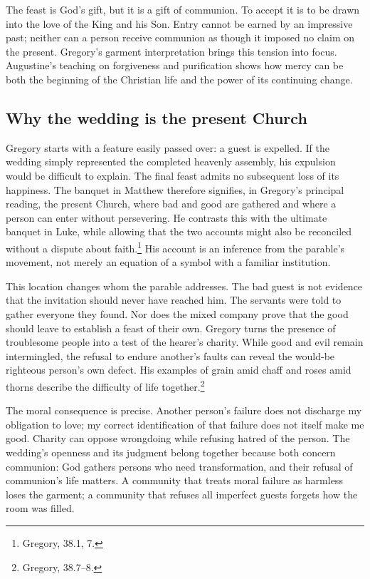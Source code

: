 \clearpage
{}
The feast is God's gift, but it is a gift of communion. To accept it is to be drawn into the love of the King and his Son. Entry cannot be earned by an impressive past; neither can a person receive communion as though it imposed no claim on the present. Gregory's garment interpretation brings this tension into focus. Augustine's teaching on forgiveness and purification shows how mercy can be both the beginning of the Christian life and the power of its continuing change.

\subsection{Why the wedding is the present Church}
Gregory starts with a feature easily passed over: a guest is expelled. If the wedding simply represented the completed heavenly assembly, his expulsion would be difficult to explain. The final feast admits no subsequent loss of its happiness. The banquet in Matthew therefore signifies, in Gregory's principal reading, the present Church, where bad and good are gathered and where a person can enter without persevering. He contrasts this with the ultimate banquet in Luke, while allowing that the two accounts might also be reconciled without a dispute about faith.\footnote{Gregory,  38.1, 7.} His account is an inference from the parable's movement, not merely an equation of a symbol with a familiar institution.

This location changes whom the parable addresses. The bad guest is not evidence that the invitation should never have reached him. The servants were told to gather everyone they found. Nor does the mixed company prove that the good should leave to establish a feast of their own. Gregory turns the presence of troublesome people into a test of the hearer's charity. While good and evil remain intermingled, the refusal to endure another's faults can reveal the would-be righteous person's own defect. His examples of grain amid chaff and roses amid thorns describe the difficulty of life together.\footnote{Gregory,  38.7--8.}

The moral consequence is precise. Another person's failure does not discharge my obligation to love; my correct identification of that failure does not itself make me good. Charity can oppose wrongdoing while refusing hatred of the person. The wedding's openness and its judgment belong together because both concern communion: God gathers persons who need transformation, and their refusal of communion's life matters. A community that treats moral failure as harmless loses the garment; a community that refuses all imperfect guests forgets how the room was filled.

